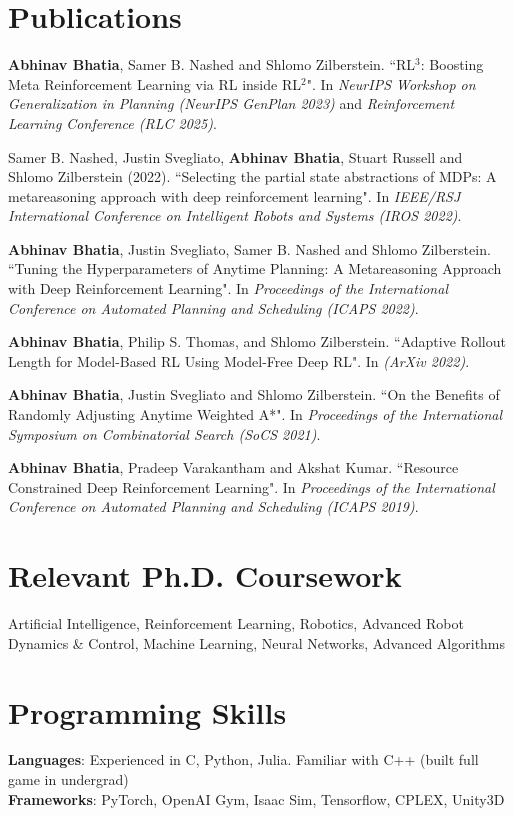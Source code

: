 \documentclass[letterpaper,11pt]{article}
\begin{document}
\section*{Publications}
\textbf{Abhinav Bhatia}, Samer B. Nashed and Shlomo Zilberstein. ``RL$^3$: Boosting Meta Reinforcement Learning via RL inside RL$^2$". In \textit{NeurIPS Workshop on Generalization in Planning (NeurIPS GenPlan 2023)} and \textit{Reinforcement Learning Conference (RLC 2025)}.

Samer B. Nashed, Justin Svegliato, \textbf{Abhinav Bhatia}, Stuart Russell and Shlomo Zilberstein (2022). ``Selecting the partial state abstractions of MDPs: A metareasoning approach with deep reinforcement learning". In \emph{IEEE/RSJ International Conference on Intelligent Robots and Systems (IROS 2022)}.

\textbf{Abhinav Bhatia}, Justin Svegliato, Samer B. Nashed and Shlomo Zilberstein. ``Tuning the Hyperparameters of Anytime Planning: A Metareasoning Approach with Deep Reinforcement Learning". In \textit{Proceedings of the International Conference on Automated Planning and Scheduling (ICAPS 2022)}.

\textbf{Abhinav Bhatia}, Philip S. Thomas, and Shlomo Zilberstein. ``Adaptive Rollout Length for Model-Based RL Using Model-Free Deep RL". In \textit{(ArXiv 2022)}.

\textbf{Abhinav Bhatia}, Justin Svegliato and Shlomo Zilberstein. ``On the Benefits of Randomly Adjusting Anytime Weighted A*". In \textit{Proceedings of the International Symposium on Combinatorial Search (SoCS 2021)}.

\textbf{Abhinav Bhatia}, Pradeep Varakantham and Akshat Kumar. ``Resource Constrained Deep Reinforcement Learning". In \textit{Proceedings of the International Conference on Automated Planning and Scheduling (ICAPS 2019)}.

\section*{Relevant Ph.D. Coursework}
Artificial Intelligence, Reinforcement Learning, Robotics, Advanced Robot Dynamics \& Control, Machine Learning, Neural Networks, Advanced Algorithms

\section*{Programming Skills}
\textbf{Languages}: Experienced in C, Python, Julia. Familiar with C++ (built full game in undergrad)\\
\textbf{Frameworks}: PyTorch, OpenAI Gym, Isaac Sim, Tensorflow, CPLEX, Unity3D
\end{document}
